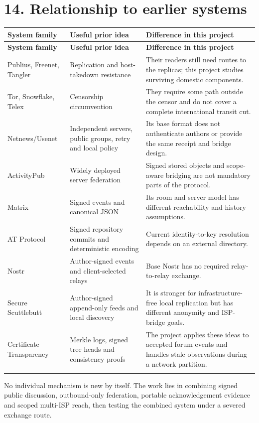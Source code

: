 \documentclass[12pt,a4paper]{article}
\begin{document}
\section*{14. Relationship to earlier systems}
\begin{small}
\begin{longtable}{@{}>{\raggedright\arraybackslash}p{}>{\raggedright\arraybackslash}p{}>{\raggedright\arraybackslash}p{}@{}}
\toprule
\textbf{System family} & \textbf{Useful prior idea} & \textbf{Difference in this project} \\
\midrule
\endfirsthead
\toprule
\textbf{System family} & \textbf{Useful prior idea} & \textbf{Difference in this project} \\
\midrule
\endhead
\bottomrule
\endfoot
Publius, Freenet, Tangler & Replication and host-takedown resistance & Their readers still need routes to the replicas; this project studies surviving domestic components. \\
\addlinespace[2pt]
Tor, Snowflake, Telex & Censorship circumvention & They require some path outside the censor and do not cover a complete international transit cut. \\
\addlinespace[2pt]
Netnews/Usenet & Independent servers, public groups, retry and local policy & Its base format does not authenticate authors or provide the same receipt and bridge design. \\
\addlinespace[2pt]
ActivityPub & Widely deployed server federation & Signed stored objects and scope-aware bridging are not mandatory parts of the protocol. \\
\addlinespace[2pt]
Matrix & Signed events and canonical JSON & Its room and server model has different reachability and history assumptions. \\
\addlinespace[2pt]
AT Protocol & Signed repository commits and deterministic encoding & Current identity-to-key resolution depends on an external directory. \\
\addlinespace[2pt]
Nostr & Author-signed events and client-selected relays & Base Nostr has no required relay-to-relay exchange. \\
\addlinespace[2pt]
Secure Scuttlebutt & Author-signed append-only feeds and local discovery & It is stronger for infrastructure-free local replication but has different anonymity and ISP-bridge goals. \\
\addlinespace[2pt]
Certificate Transparency & Merkle logs, signed tree heads and consistency proofs & The project applies these ideas to accepted forum events and handles stale observations during a network partition. \\
\addlinespace[2pt]
\end{longtable}
\end{small}
No individual mechanism is new by itself. The work lies in combining signed public discussion, outbound-only federation, portable acknowledgement evidence and scoped multi-ISP reach, then testing the combined system under a severed exchange route.
\end{document}
